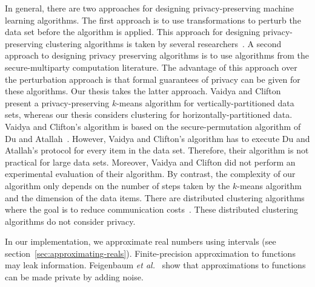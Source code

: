 
In general, there are two approaches for designing privacy-preserving
machine learning algorithms. The first approach is to use
transformations to perturb the data set before the algorithm is
applied. This approach for designing privacy-preserving clustering
algorithms is taken by several
researchers~\cite{Klusch,MeruguGhosh,Oliveira}. A second approach to
designing privacy preserving algorithms is to use algorithms from the
secure-multiparty computation literature. The advantage of this
approach over the perturbation approach is that formal guarantees of
privacy can be given for these algorithms. Our thesis takes the latter
approach. Vaidya and Clifton~\cite{VaidyaClifton} present a
privacy-preserving $k$-means algorithm for vertically-partitioned data
sets, whereas our thesis considers
clustering for horizontally-partitioned data. Vaidya and Clifton's
algorithm is based on the secure-permutation algorithm of Du and
Atallah~\cite{DuAtallah}. However, Vaidya and Clifton's algorithm has
to execute Du and Atallah's protocol for every item in the data
set. Therefore, their algorithm is not practical for large data sets.
Moreover, Vaidya and Clifton did not perform an experimental
evaluation of their algorithm.  By contrast, the complexity of our
algorithm only depends on the number of steps taken by the $k$-means
algorithm and the dimension of the data items. There are distributed
clustering algorithms where the goal is to reduce communication
costs~\cite{DhillonModha,Kargupta}.  These distributed clustering
algorithms do not consider privacy.

In our implementation, we approximate real numbers using intervals
(see section~\ref{sec:approximating-reals}).  Finite-precision
approximation to functions may leak information. Feigenbaum {\it et
al.}~\cite{Nissim:2001} show that approximations to functions can be
made private by adding noise.

